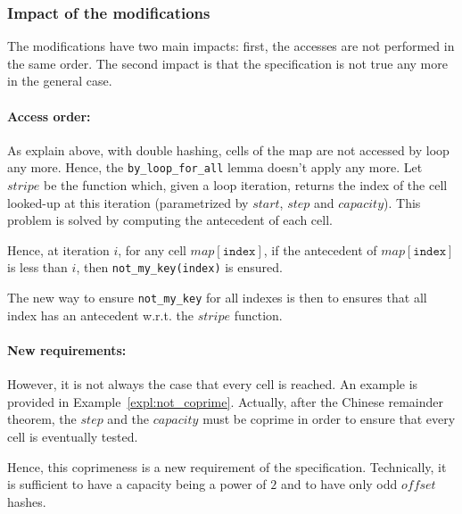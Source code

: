\documentclass[oneside]{article}
\begin{document}
\subsubsection{Impact of the modifications}
The modifications have two main impacts: first, the accesses are not performed in the same order. The second impact is that the specification is not true any more in the general case.

\paragraph{Access order:}
As explain above, with double hashing, cells of the map are not accessed by loop any more. Hence, the \texttt{by\_loop\_for\_all} lemma doesn't apply any more. Let $stripe$ be the function which, given a loop iteration, returns the index of the cell looked-up at this iteration (parametrized by $start$, $step$ and $capacity$). This problem is solved by computing the antecedent of each cell. 

Hence, at iteration $i$, for any cell $map[\mathtt{index}]$, if the antecedent of $map[\mathtt{index}]$ is less than $i$, then \texttt{not\_my\_key(index)} is ensured.

The new way to ensure \texttt{not\_my\_key} for all indexes is then to ensures that all index has an antecedent w.r.t. the $stripe$ function.

\paragraph{New requirements:}
However, it is not always the case that every cell is reached. An example is provided in Example~\ref{expl:not_coprime}. Actually, after the Chinese remainder theorem, the $step$ and the $capacity$ must be coprime in order to ensure that every cell is eventually tested.

Hence, this coprimeness is a new requirement of the specification. Technically, it is sufficient to have a capacity being a power of $2$ and to have only odd $offset$ hashes.
\end{document}

